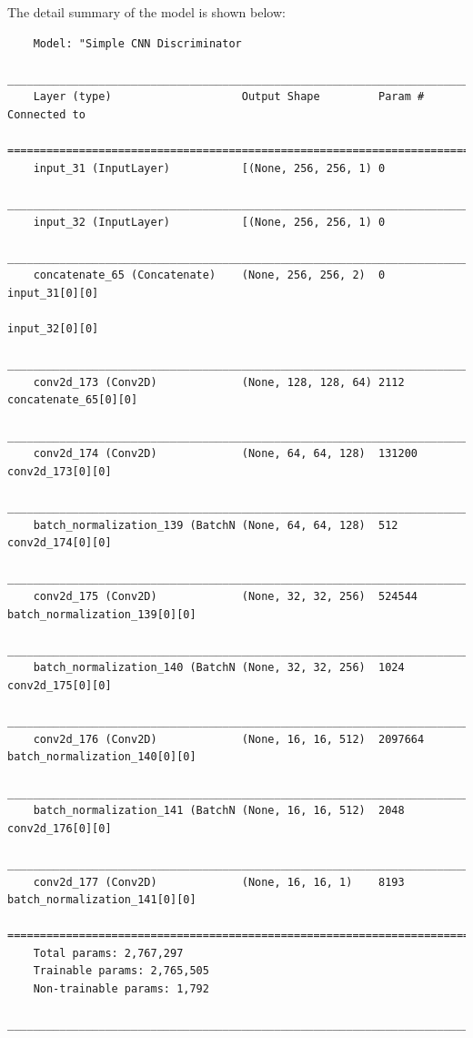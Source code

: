                 The detail summary of the model is shown below:
                {\scriptsize
                \begin{verbatim}
    Model: "Simple CNN Discriminator
    __________________________________________________________________________________________________
    Layer (type)                    Output Shape         Param #     Connected to                     
    ==================================================================================================
    input_31 (InputLayer)           [(None, 256, 256, 1) 0                                            
    __________________________________________________________________________________________________
    input_32 (InputLayer)           [(None, 256, 256, 1) 0                                            
    __________________________________________________________________________________________________
    concatenate_65 (Concatenate)    (None, 256, 256, 2)  0           input_31[0][0]                   
                                                                        input_32[0][0]                   
    __________________________________________________________________________________________________
    conv2d_173 (Conv2D)             (None, 128, 128, 64) 2112        concatenate_65[0][0]             
    __________________________________________________________________________________________________
    conv2d_174 (Conv2D)             (None, 64, 64, 128)  131200      conv2d_173[0][0]                 
    __________________________________________________________________________________________________
    batch_normalization_139 (BatchN (None, 64, 64, 128)  512         conv2d_174[0][0]                 
    __________________________________________________________________________________________________
    conv2d_175 (Conv2D)             (None, 32, 32, 256)  524544      batch_normalization_139[0][0]    
    __________________________________________________________________________________________________
    batch_normalization_140 (BatchN (None, 32, 32, 256)  1024        conv2d_175[0][0]                 
    __________________________________________________________________________________________________
    conv2d_176 (Conv2D)             (None, 16, 16, 512)  2097664     batch_normalization_140[0][0]    
    __________________________________________________________________________________________________
    batch_normalization_141 (BatchN (None, 16, 16, 512)  2048        conv2d_176[0][0]                 
    __________________________________________________________________________________________________
    conv2d_177 (Conv2D)             (None, 16, 16, 1)    8193        batch_normalization_141[0][0]    
    ==================================================================================================
    Total params: 2,767,297
    Trainable params: 2,765,505
    Non-trainable params: 1,792
    __________________________________________________________________________________________________   
                \end{verbatim}}
            
